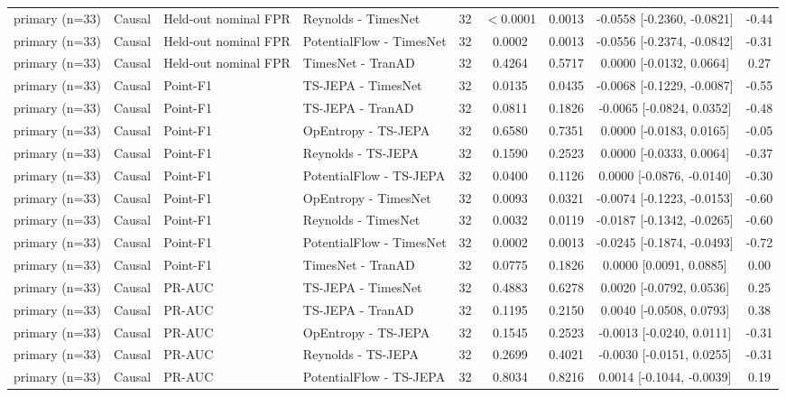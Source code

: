 \begin{table}[t]
\begin{tabular}{@{}llllccccc@{}}
primary (n=33) & Causal & Held-out nominal FPR & Reynolds - TimesNet & 32 & $<$0.0001 & 0.0013 & -0.0558 [-0.2360, -0.0821] & -0.44 \\
primary (n=33) & Causal & Held-out nominal FPR & PotentialFlow - TimesNet & 32 & 0.0002 & 0.0013 & -0.0556 [-0.2374, -0.0842] & -0.31 \\
primary (n=33) & Causal & Held-out nominal FPR & TimesNet - TranAD & 32 & 0.4264 & 0.5717 & 0.0000 [-0.0132, 0.0664] & 0.27 \\
primary (n=33) & Causal & Point-F1 & TS-JEPA - TimesNet & 32 & 0.0135 & 0.0435 & -0.0068 [-0.1229, -0.0087] & -0.55 \\
primary (n=33) & Causal & Point-F1 & TS-JEPA - TranAD & 32 & 0.0811 & 0.1826 & -0.0065 [-0.0824, 0.0352] & -0.48 \\
primary (n=33) & Causal & Point-F1 & OpEntropy - TS-JEPA & 32 & 0.6580 & 0.7351 & 0.0000 [-0.0183, 0.0165] & -0.05 \\
primary (n=33) & Causal & Point-F1 & Reynolds - TS-JEPA & 32 & 0.1590 & 0.2523 & 0.0000 [-0.0333, 0.0064] & -0.37 \\
primary (n=33) & Causal & Point-F1 & PotentialFlow - TS-JEPA & 32 & 0.0400 & 0.1126 & 0.0000 [-0.0876, -0.0140] & -0.30 \\
primary (n=33) & Causal & Point-F1 & OpEntropy - TimesNet & 32 & 0.0093 & 0.0321 & -0.0074 [-0.1223, -0.0153] & -0.60 \\
primary (n=33) & Causal & Point-F1 & Reynolds - TimesNet & 32 & 0.0032 & 0.0119 & -0.0187 [-0.1342, -0.0265] & -0.60 \\
primary (n=33) & Causal & Point-F1 & PotentialFlow - TimesNet & 32 & 0.0002 & 0.0013 & -0.0245 [-0.1874, -0.0493] & -0.72 \\
primary (n=33) & Causal & Point-F1 & TimesNet - TranAD & 32 & 0.0775 & 0.1826 & 0.0000 [0.0091, 0.0885] & 0.00 \\
primary (n=33) & Causal & PR-AUC & TS-JEPA - TimesNet & 32 & 0.4883 & 0.6278 & 0.0020 [-0.0792, 0.0536] & 0.25 \\
primary (n=33) & Causal & PR-AUC & TS-JEPA - TranAD & 32 & 0.1195 & 0.2150 & 0.0040 [-0.0508, 0.0793] & 0.38 \\
primary (n=33) & Causal & PR-AUC & OpEntropy - TS-JEPA & 32 & 0.1545 & 0.2523 & -0.0013 [-0.0240, 0.0111] & -0.31 \\
primary (n=33) & Causal & PR-AUC & Reynolds - TS-JEPA & 32 & 0.2699 & 0.4021 & -0.0030 [-0.0151, 0.0255] & -0.31 \\
primary (n=33) & Causal & PR-AUC & PotentialFlow - TS-JEPA & 32 & 0.8034 & 0.8216 & 0.0014 [-0.1044, -0.0039] & 0.19 \\

\end{tabular}
\end{table}
